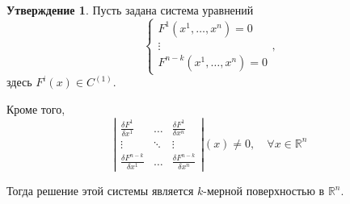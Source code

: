\documentclass{report}
\theoremstyle{definition}
\newtheorem{statement}{Утверждение}[section]
\begin{document}
\begin{statement}
  Пусть задана система уравнений
  \begin{equation*}
    \left\{\begin{array}{l}
      F^1(x^1,\ldots,x^n) = 0 \\
      \vdots                  \\
      F^{n-k}(x^1,\ldots,x^n) = 0
    \end{array}\right.,
  \end{equation*}
  здесь $F^i(x)\in C^{(1)}$.

  Кроме того,
  \begin{equation*}
    \left|\begin{array}{ccc}
      \frac{\delta F^1}{\delta x^1}     & \ldots & \frac{\delta F^1}{\delta x^n}     \\
      \vdots                            & \ddots & \vdots                            \\
      \frac{\delta F^{n-k}}{\delta x^1} & \ldots & \frac{\delta F^{n-k}}{\delta x^n}
    \end{array}\right|(x) \ne 0, \quad \forall x \in \mathbb{R}^n
  \end{equation*}

  Тогда решение этой системы является $k$-мерной поверхностью в $\mathbb{R}^n$.
\end{statement}
\end{document}

